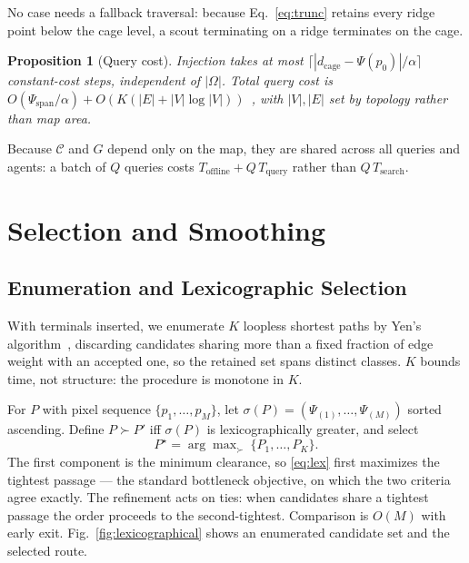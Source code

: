 \documentclass[conference]{IEEEtran}
\newtheorem{proposition}{Proposition}
\begin{document}
No case needs a fallback traversal: because Eq.~\eqref{eq:trunc} retains every ridge point below the cage level, a scout terminating on a ridge terminates on the cage.

\begin{proposition}[Query cost]
Injection takes at most $\lceil |d_{\mathrm{cage}}-\Psi(p_0)|/\alpha \rceil$ constant-cost steps, independent of $|\Omega|$. Total query cost is $O(\Psi_{\text{span}}/\alpha) + O(K(|E|+|V|\log|V|))$~\cite{yen1971}, with $|V|,|E|$ set by topology rather than map area.
\end{proposition}

Because $\mathcal{C}$ and $G$ depend only on the map, they are shared across all queries and agents: a batch of $Q$ queries costs $T_{\mathrm{offline}}+Q\,T_{\mathrm{query}}$ rather than $Q\,T_{\mathrm{search}}$.

\section{Selection and Smoothing}
\label{sec:opt}

\subsection{Enumeration and Lexicographic Selection}

With terminals inserted, we enumerate $K$ loopless shortest paths by Yen's algorithm~\cite{yen1971}, discarding candidates sharing more than a fixed fraction of edge weight with an accepted one, so the retained set spans distinct classes. $K$ bounds time, not structure: the procedure is monotone in $K$.

For $P$ with pixel sequence $\{p_1,\dots,p_M\}$, let $\sigma(P)=(\Psi_{(1)},\dots,\Psi_{(M)})$ sorted ascending. Define $P\succ P'$ iff $\sigma(P)$ is lexicographically greater, and select
\begin{equation}
P^\star=\arg\max\nolimits_{\succ}\ \{P_1,\dots,P_K\} .
\label{eq:lex}
\end{equation}
The first component is the minimum clearance, so \eqref{eq:lex} first maximizes the tightest passage --- the standard bottleneck objective, on which the two criteria agree exactly. The refinement acts on ties: when candidates share a tightest passage the order proceeds to the second-tightest.  Comparison is $O(M)$ with early exit. Fig.~\ref{fig:lexicographical} shows an enumerated candidate set and the selected route.
\end{document}
